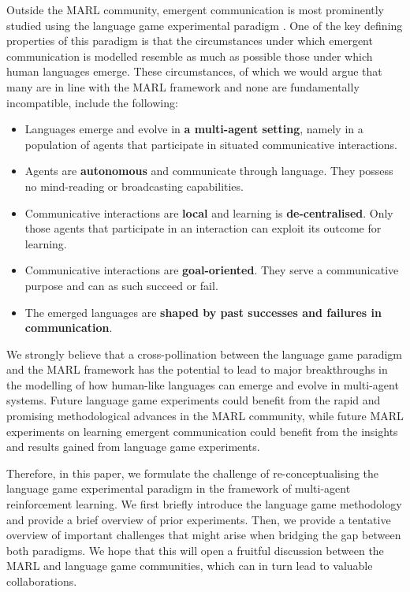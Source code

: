 \documentclass[a4paper,abstract]{scrartcl}
\begin{document}
Outside the MARL community, emergent communication is most prominently studied using the language game experimental paradigm \citep{steels1995self,steels2012experiments,beuls2013agent}. One of the key defining properties of this paradigm is that the circumstances under which emergent communication is modelled resemble as much as possible those under which human languages emerge. These circumstances, of which we would argue that many are in line with the MARL framework and none are fundamentally incompatible, include the following:

\begin{itemize}
\item Languages emerge and evolve in \textbf{a multi-agent setting}, namely in a population of agents that participate in situated communicative interactions.
\item Agents are \textbf{autonomous} and communicate through language. They possess no mind-reading or broadcasting capabilities.
\item Communicative interactions are \textbf{local} and learning is \textbf{de-centralised}. Only those agents that participate in an interaction can exploit its outcome for learning.
\item Communicative interactions are \textbf{goal-oriented}. They serve a communicative purpose and can as such succeed or fail.
\item The emerged languages are \textbf{shaped by past successes and failures in communication}.
\end{itemize}

We strongly believe that a cross-pollination between the language game paradigm and the MARL framework has the potential to lead to major breakthroughs in the modelling of how human-like languages can emerge and evolve in multi-agent systems. Future language game experiments could benefit from the rapid and promising methodological advances in the MARL community, while future MARL experiments on learning emergent communication could benefit from the insights and results gained from language game experiments.  

Therefore, in this paper, we formulate the challenge of re-conceptualising the language game experimental paradigm in the framework of multi-agent reinforcement learning. We first briefly introduce the language game methodology and provide a brief overview of prior experiments. Then, we provide a tentative overview of important challenges that might arise when bridging the gap between both paradigms. We hope that this will open a fruitful discussion between the MARL and language game communities, which can in turn lead to valuable collaborations. 
\end{document}
